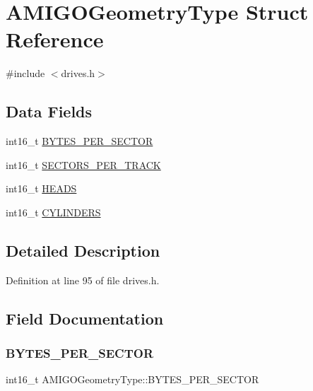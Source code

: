 \hypertarget{structAMIGOGeometryType}{}\section{A\+M\+I\+G\+O\+Geometry\+Type Struct Reference}
\label{structAMIGOGeometryType}


{\ttfamily \#include $<$drives.\+h$>$}

\subsection*{Data Fields}
\begin{DoxyCompactItemize}
\item 
int16\+\_\+t \hyperlink{structAMIGOGeometryType_a446d9194981ebd7af3c1b11cdbdf0cfd}{B\+Y\+T\+E\+S\+\_\+\+P\+E\+R\+\_\+\+S\+E\+C\+T\+OR}
\item 
int16\+\_\+t \hyperlink{structAMIGOGeometryType_ac19c5a32ffb2f05ebb00c64cac0903ee}{S\+E\+C\+T\+O\+R\+S\+\_\+\+P\+E\+R\+\_\+\+T\+R\+A\+CK}
\item 
int16\+\_\+t \hyperlink{structAMIGOGeometryType_a0c058525ff9c043708a0773eec513dbf}{H\+E\+A\+DS}
\item 
int16\+\_\+t \hyperlink{structAMIGOGeometryType_a5a0d5f6611aeb7db58ff4a851bde8fcf}{C\+Y\+L\+I\+N\+D\+E\+RS}
\end{DoxyCompactItemize}


\subsection{Detailed Description}


Definition at line 95 of file drives.\+h.



\subsection{Field Documentation}
\mbox{\label{structAMIGOGeometryType_a446d9194981ebd7af3c1b11cdbdf0cfd}} 
\subsubsection{\texorpdfstring{B\+Y\+T\+E\+S\+\_\+\+P\+E\+R\+\_\+\+S\+E\+C\+T\+OR}{BYTES\_PER\_SECTOR}}
{\footnotesize\ttfamily int16\+\_\+t A\+M\+I\+G\+O\+Geometry\+Type\+::\+B\+Y\+T\+E\+S\+\_\+\+P\+E\+R\+\_\+\+S\+E\+C\+T\+OR}



